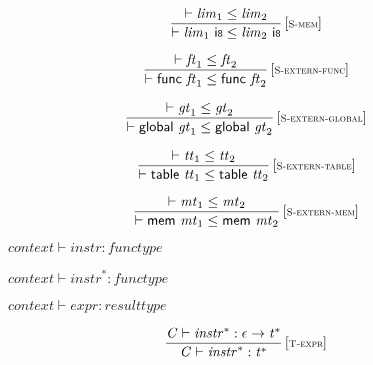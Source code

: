 $$
\begin{array}{@{}c@{}}\displaystyle
\frac{
{ \vdash }\;{\mathit{lim}}_{{1}} \leq {\mathit{lim}}_{{2}}
}{
{ \vdash }\;{\mathit{lim}}_{{1}}~\mathsf{i{\scriptstyle8}} \leq {\mathit{lim}}_{{2}}~\mathsf{i{\scriptstyle8}}
} \, {[\textsc{\scriptsize S{-}mem}]}
\qquad
\end{array}
$$

\vspace{1ex}

$$
\begin{array}{@{}c@{}}\displaystyle
\frac{
{ \vdash }\;{\mathit{ft}}_{{1}} \leq {\mathit{ft}}_{{2}}
}{
{ \vdash }\;\mathsf{func}~{\mathit{ft}}_{{1}} \leq \mathsf{func}~{\mathit{ft}}_{{2}}
} \, {[\textsc{\scriptsize S{-}extern{-}func}]}
\qquad
\end{array}
$$

$$
\begin{array}{@{}c@{}}\displaystyle
\frac{
{ \vdash }\;{\mathit{gt}}_{{1}} \leq {\mathit{gt}}_{{2}}
}{
{ \vdash }\;\mathsf{global}~{\mathit{gt}}_{{1}} \leq \mathsf{global}~{\mathit{gt}}_{{2}}
} \, {[\textsc{\scriptsize S{-}extern{-}global}]}
\qquad
\end{array}
$$

$$
\begin{array}{@{}c@{}}\displaystyle
\frac{
{ \vdash }\;{\mathit{tt}}_{{1}} \leq {\mathit{tt}}_{{2}}
}{
{ \vdash }\;\mathsf{table}~{\mathit{tt}}_{{1}} \leq \mathsf{table}~{\mathit{tt}}_{{2}}
} \, {[\textsc{\scriptsize S{-}extern{-}table}]}
\qquad
\end{array}
$$

$$
\begin{array}{@{}c@{}}\displaystyle
\frac{
{ \vdash }\;{\mathit{mt}}_{{1}} \leq {\mathit{mt}}_{{2}}
}{
{ \vdash }\;\mathsf{mem}~{\mathit{mt}}_{{1}} \leq \mathsf{mem}~{\mathit{mt}}_{{2}}
} \, {[\textsc{\scriptsize S{-}extern{-}mem}]}
\qquad
\end{array}
$$

\vspace{1ex}

$\boxed{{\mathit{context}} \vdash {\mathit{instr}} : {\mathit{functype}}}$

$\boxed{{\mathit{context}} \vdash {{\mathit{instr}}^\ast} : {\mathit{functype}}}$

$\boxed{{\mathit{context}} \vdash {\mathit{expr}} : {\mathit{resulttype}}}$

\vspace{1ex}

$$
\begin{array}{@{}c@{}}\displaystyle
\frac{
{\mathit{C}} \vdash {{\mathit{instr}}^\ast} : \epsilon \rightarrow {{\mathit{t}}^\ast}
}{
{\mathit{C}} \vdash {{\mathit{instr}}^\ast} : {{\mathit{t}}^\ast}
} \, {[\textsc{\scriptsize T{-}expr}]}
\qquad
\end{array}
$$

